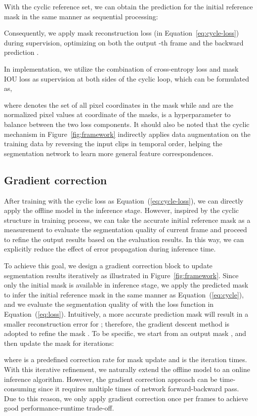 \documentclass{article}
\begin{document}
With the cyclic reference set, we can obtain the prediction for the initial reference mask in the same manner as sequential processing:

Consequently, we apply mask reconstruction loss (in Equation~\ref{eq:cycle-loss}) during supervision, optimizing on both the output -th frame and the backward prediction .

In implementation, we utilize the combination of cross-entropy loss and mask IOU loss as supervision at both sides of the cyclic loop, which can be formulated as,

where  denotes the set of all pixel coordinates in the mask while  and  are the normalized pixel values at coordinate  of the masks,  is a hyperparameter to balance between the two loss components. It should also be noted that the cyclic mechanism in Figure~\ref{fig:framework} indirectly applies data augmentation on the training data by reversing the input clips in temporal order, helping the segmentation network to learn more general feature correspondences.

\subsection{Gradient correction}
After training with the cyclic loss as Equation~(\ref{eq:cycle-loss}), we can directly apply the offline model in the inference stage. However, inspired by the cyclic structure in training process, we can take the accurate initial reference mask as a measurement to evaluate the segmentation quality of current frame and proceed to refine the output results based on the evaluation results. In this way, we can explicitly reduce the effect of error propagation during inference time.

To achieve this goal, we design a gradient correction block to update segmentation results iteratively as illustrated in Figure~\ref{fig:framework}. Since only the initial mask  is available in inference stage, we apply the predicted mask  to infer the initial reference mask in the same manner as Equation~(\ref{eq:cycle}), and we evaluate the segmentation quality of  with the loss function in Equation~(\ref{eq:loss}). Intuitively, a more accurate prediction mask  will result in a smaller reconstruction error for ; therefore, the gradient descent method is adopted to refine the mask . To be specific, we start from an output mask , and then update the mask for  iterations:

where  is a predefined correction rate for mask update and  is the iteration times. With this iterative refinement, we naturally extend the offline model to an online inference algorithm. However, the gradient correction approach can be time-consuming since it requires multiple times of network forward-backward pass. Due to this reason, we only apply gradient correction once per  frames to achieve good performance-runtime trade-off.
\end{document}
